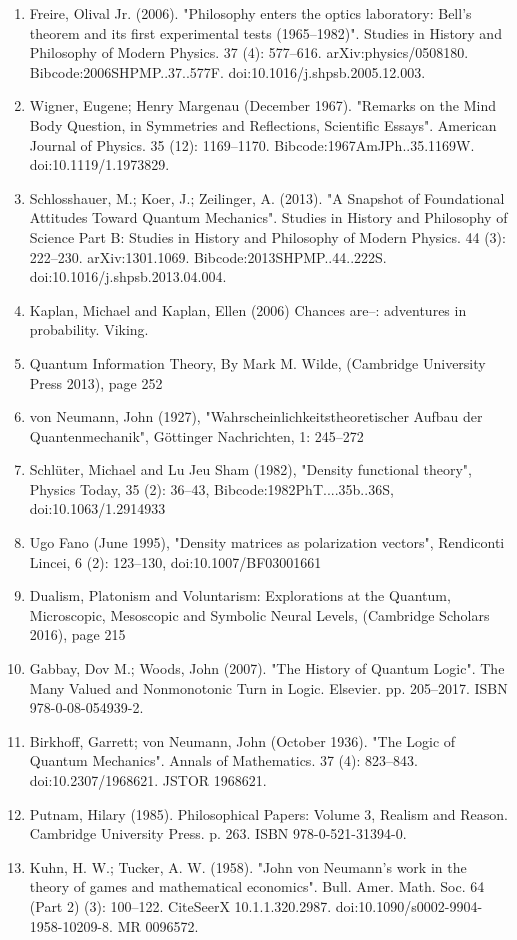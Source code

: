\begin{enumerate}
\item Freire, Olival Jr. (2006). "Philosophy enters the optics laboratory: Bell's theorem and its first experimental tests (1965–1982)". Studies in History and Philosophy of Modern Physics. 37 (4): 577–616. arXiv:physics/0508180. Bibcode:2006SHPMP..37..577F. doi:10.1016/j.shpsb.2005.12.003.
\item Wigner, Eugene; Henry Margenau (December 1967). "Remarks on the Mind Body Question, in Symmetries and Reflections, Scientific Essays". American Journal of Physics. 35 (12): 1169–1170. Bibcode:1967AmJPh..35.1169W. doi:10.1119/1.1973829.
\item Schlosshauer, M.; Koer, J.; Zeilinger, A. (2013). "A Snapshot of Foundational Attitudes Toward Quantum Mechanics". Studies in History and Philosophy of Science Part B: Studies in History and Philosophy of Modern Physics. 44 (3): 222–230. arXiv:1301.1069. Bibcode:2013SHPMP..44..222S. doi:10.1016/j.shpsb.2013.04.004.
\item Kaplan, Michael and Kaplan, Ellen (2006) Chances are–: adventures in probability. Viking.
\item Quantum Information Theory, By Mark M. Wilde, (Cambridge University Press 2013), page 252
\item von Neumann, John (1927), "Wahrscheinlichkeitstheoretischer Aufbau der Quantenmechanik", Göttinger Nachrichten, 1: 245–272
\item Schlüter, Michael and Lu Jeu Sham (1982), "Density functional theory", Physics Today, 35 (2): 36–43, Bibcode:1982PhT....35b..36S, doi:10.1063/1.2914933
\item Ugo Fano (June 1995), "Density matrices as polarization vectors", Rendiconti Lincei, 6 (2): 123–130, doi:10.1007/BF03001661
\item Dualism, Platonism and Voluntarism: Explorations at the Quantum, Microscopic, Mesoscopic and Symbolic Neural Levels, (Cambridge Scholars 2016), page 215
\item Gabbay, Dov M.; Woods, John (2007). "The History of Quantum Logic". The Many Valued and Nonmonotonic Turn in Logic. Elsevier. pp. 205–2017. ISBN 978-0-08-054939-2.
\item Birkhoff, Garrett; von Neumann, John (October 1936). "The Logic of Quantum Mechanics". Annals of Mathematics. 37 (4): 823–843. doi:10.2307/1968621. JSTOR 1968621.
\item Putnam, Hilary (1985). Philosophical Papers: Volume 3, Realism and Reason. Cambridge University Press. p. 263. ISBN 978-0-521-31394-0.
\item Kuhn, H. W.; Tucker, A. W. (1958). "John von Neumann's work in the theory of games and mathematical economics". Bull. Amer. Math. Soc. 64 (Part 2) (3): 100–122. CiteSeerX 10.1.1.320.2987. doi:10.1090/s0002-9904-1958-10209-8. MR 0096572.

\end{enumerate}
